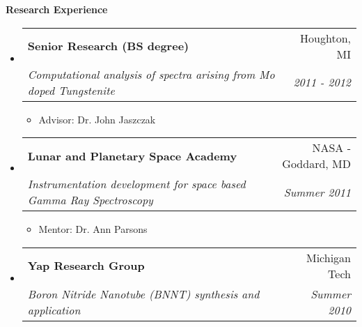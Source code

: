 \documentclass[letterpaper,11pt]{article}
\makeatletter
\newcommand{\resitem}[1]{\item #1 \vspace{-2pt}}
\newcommand{\resheading}[1]{{\large \textbf{#1}}}
\newcommand{\ressubheading}[4]{
\begin{tabular*}{6.5in}{l@{\extracolsep{\fill}}r}
		\textbf{#1} & #2 \\
		\textit{#3} & \textit{#4} \\
\end{tabular*}\vspace{-6pt}}
\makeatother
\begin{document}

\resheading{Research Experience}
\begin{itemize}
\item%
	\ressubheading{Senior Research (BS degree)}{Houghton, MI}{Computational analysis of spectra arising from Mo doped Tungstenite}{2011 - 2012}
	{\footnotesize
	\begin{itemize}
		\resitem{Advisor: Dr. John Jaszczak}
	\end{itemize}
	}
\item%
	\ressubheading{Lunar and Planetary Space Academy}{NASA - Goddard, MD}{Instrumentation development for space based Gamma Ray Spectroscopy}{Summer 2011}
	{\footnotesize
	\begin{itemize}
		\resitem{Mentor: Dr. Ann Parsons}
	\end{itemize}
	}
\item%
	\ressubheading{Yap Research Group}{Michigan Tech}{Boron Nitride Nanotube (BNNT) synthesis and application}{Summer 2010}
\end{itemize}
\end{document}

